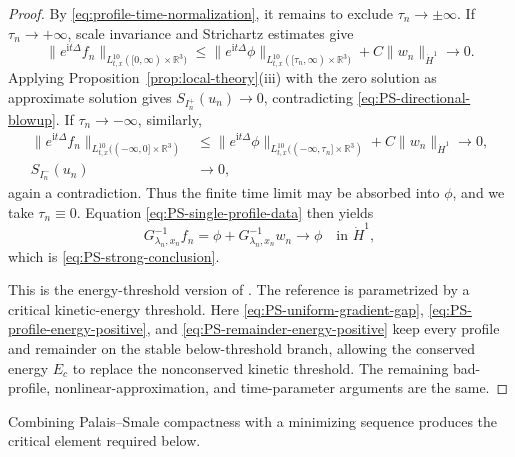 \documentclass{interact}
\numberwithin{equation}{section}
\theoremstyle{plain}
\theoremstyle{definition}
\theoremstyle{remark}
\newcommand{\R}{\mathbb R}
\newcommand{\ii}{\mathrm i}
\begin{document}
\begin{proof}
By \eqref{eq:profile-time-normalization}, it remains to exclude $\tau_n\to\pm\infty$. If $\tau_n\to+\infty$, scale invariance and Strichartz estimates give
\[
 \|e^{\ii t\Delta}f_n\|_{L_{t,x}^{10}([0,\infty)\times\R^3)}
 \le
 \|e^{\ii t\Delta}\phi\|_{L_{t,x}^{10}([\tau_n,\infty)\times\R^3)}
 +C\|w_n\|_{\dot H^1}
 \longrightarrow0.
\]
Applying Proposition~\ref{prop:local-theory}(iii) with the zero solution as approximate solution gives $S_{I_n^+}(u_n)\to0$, contradicting \eqref{eq:PS-directional-blowup}. If $\tau_n\to-\infty$, similarly,
\begin{align*}
 \|e^{\ii t\Delta}f_n\|_{L_{t,x}^{10}(( -\infty,0]\times\R^3)}
 &\le
 \|e^{\ii t\Delta}\phi\|_{L_{t,x}^{10}(( -\infty,\tau_n]\times\R^3)}
 +C\|w_n\|_{\dot H^1}
 \longrightarrow0,\\
 S_{I_n^-}(u_n)&\longrightarrow0,
\end{align*}
again a contradiction. Thus the finite time limit may be absorbed into $\phi$, and we take $\tau_n\equiv0$. Equation \eqref{eq:PS-single-profile-data} then yields
\[
 G_{\lambda_n,x_n}^{-1}f_n
 =\phi+G_{\lambda_n,x_n}^{-1}w_n
 \longrightarrow\phi
 \quad\text{in }\dot H^1,
\]
which is \eqref{eq:PS-strong-conclusion}.

This is the energy-threshold version of \cite[Proposition~5.6]{KillipVisan2013}. The reference is parametrized by a critical kinetic-energy threshold. Here \eqref{eq:PS-uniform-gradient-gap}, \eqref{eq:PS-profile-energy-positive}, and \eqref{eq:PS-remainder-energy-positive} keep every profile and remainder on the stable below-threshold branch, allowing the conserved energy $E_c$ to replace the nonconserved kinetic threshold. The remaining bad-profile, nonlinear-approximation, and time-parameter arguments are the same.
\end{proof}

Combining Palais--Smale compactness with a minimizing sequence produces the critical element required below.
\end{document}
